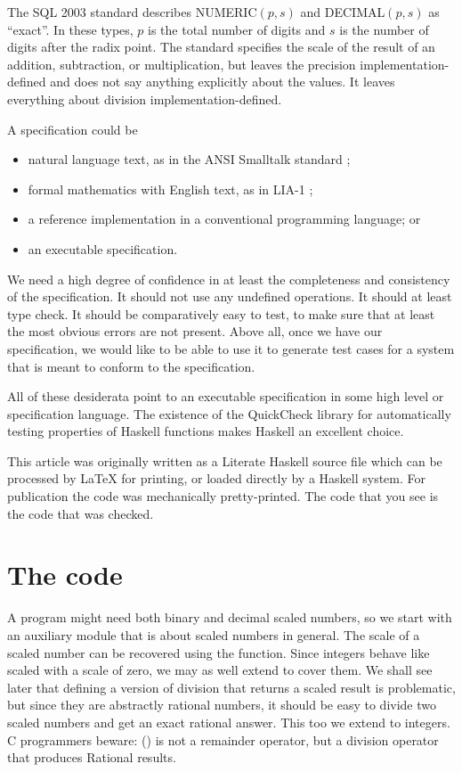 \documentclass[prodmode,acmtoplas]{acmsmall}
\begin{document}
The SQL 2003 standard \cite{SQL} describes NUMERIC$(p,s)$ and
DECIMAL$(p,s)$ as ``exact''.  In these types, $p$ is the total number
of digits and $s$ is the number of digits after the radix point.  The
standard specifies the scale of the result of an addition, subtraction,
or multiplication, but leaves the precision implementation-defined and
does not say anything explicitly about the values.  It
leaves everything about division implementation-defined.

A specification could be
\begin{itemize}
\item natural language text,
 as in the ANSI Smalltalk standard \cite{ANST};
\item formal mathematics with English text, as in LIA-1 \cite{LIA1};
\item a reference implementation in a conventional programming language; or
\item an executable specification.
\end{itemize}

We need a high degree of confidence in at least the completeness and
consistency of the specification.  It should not use any undefined
operations.  It should at least type check.  It should be comparatively
easy to test, to make sure that at least the most obvious errors are not
present.  Above all, once we have our specification, we would like to be
able to use it to generate test cases for a system that is meant to
conform to the specification.

All of these desiderata point to an executable specification in some
high level or specification language.  The existence of the QuickCheck
\cite{QC1,QC2} library \cite{QC4} for automatically testing properties of
Haskell functions makes Haskell \cite{HASK} an excellent choice.

This article was originally written as a Literate Haskell source file
which can be processed by LaTeX for printing, or loaded directly by a
Haskell system.  For publication the code was mechanically pretty-printed.
The code that you see is the code that was checked.

\section{The code}

A program might need both binary and decimal scaled numbers, so
we start with an auxiliary module that is about scaled numbers
in general.  The scale of a scaled number can be recovered using
the  function.  Since integers behave like scaled
with a scale of zero, we may as well extend 
to cover them.  We shall see later that defining a version of
division that returns a scaled result is problematic,
but since they are abstractly rational numbers, it should be easy
to divide two scaled numbers and get an exact rational answer.
This too we extend to integers.
C programmers beware:  (\hask{\%}) is not a remainder operator,
but a division operator that produces Rational results.
\end{document}
